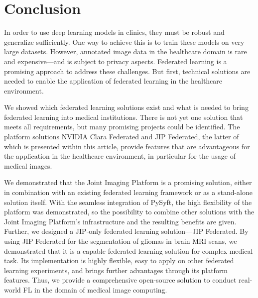 \section{Conclusion}
\label{sec:Conclusion}

In order to use deep learning models in clinics, they must be robust and generalize sufficiently. One way to achieve this is to train these models on very large datasets. However, annotated image data in the healthcare domain is rare and expensive---and is subject to privacy aspects.
Federated learning is a promising approach to address these challenges.
But first, technical solutions are needed to enable the application of federated learning in the healthcare environment.


We showed which federated learning solutions exist and what is needed to bring federated learning into medical institutions. There is not yet one solution that meets all requirements, but many promising projects could be identified.
The platform solutions NVIDIA Clara Federated and JIP Federated, the latter of which is presented within this article, provide features that are advantageous for the application in the healthcare environment, in particular for the usage of medical images.

We demonstrated that the Joint Imaging Platform is a promising solution, either in combination with an existing federated learning framework or as a stand-alone solution itself.
With the seamless integration of PySyft, the high flexibility of the platform was demonstrated, so the possibility to combine other solutions with the Joint Imaging Platform's infrastructure and the resulting benefits are given.
Further, we designed a JIP-only federated learning solution---JIP Federated.
By using JIP Federated for the segmentation of gliomas in brain MRI scans, we demonstrated that it is a capable federated learning solution for complex medical task. Its implementation is highly flexible, easy to apply on other federated learning experiments, and brings further advantages through its platform features.
Thus, we provide a comprehensive open-source solution to conduct real-world FL in the domain of medical image computing.

